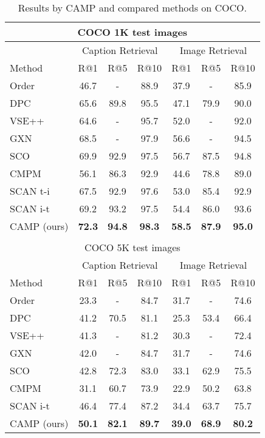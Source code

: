 \documentclass[10pt,twocolumn,letterpaper]{article}
\begin{document}
\begin{table}
\begin{center}
\small
\setlength{\tabcolsep}{1.3mm}
\begin{tabular}{|l|ccc|ccc|}
\hline
\multicolumn{7}{|c|}{COCO 1K test images}\\
\hline
& \multicolumn{3}{c|}{Caption Retrieval}
& \multicolumn{3}{c|}{Image Retrieval} \\
{Method}
& {R@1} & {R@5} & {R@10}
& {R@1} & {R@5} & {R@10}  \\
\hline\hline
Order~\cite{vendrov2015order} & 46.7 & - & 88.9 & 37.9 & - & 85.9 \\
DPC~\cite{zheng2017dual} & 65.6 & 89.8 & 95.5 & 47.1 & 79.9 & 90.0 \\
VSE++~\cite{faghri2017vse++} & 64.6 & - & 95.7 & 52.0 & - & 92.0  \\
GXN~\cite{gu2018look} & 68.5 & - & 97.9 & 56.6 & - & 94.5 \\
SCO~\cite{huang2017learning} & 69.9 & 92.9 & 97.5 & 56.7 & 87.5 & 94.8 \\
CMPM~\cite{ying2018CMPM} & 56.1 & 86.3 & 92.9 & 44.6 & 78.8 & 89.0 \\
SCAN t-i~\cite{lee2018stacked} & 67.5 & 92.9 & 97.6 & 53.0 & 85.4 & 92.9 \\
SCAN i-t~\cite{lee2018stacked} & 69.2 & 93.2 & 97.5 & 54.4 & 86.0 & 93.6 \\
\hline
CAMP (ours) & \textbf{72.3} & \textbf{94.8} & \textbf{98.3} & \textbf{58.5} & \textbf{87.9} & \textbf{95.0} \\
\hline
\multicolumn{7}{c}{} \\
\hline
\multicolumn{7}{|c|}{COCO 5K test images}\\
\hline
& \multicolumn{3}{c|}{Caption Retrieval}
& \multicolumn{3}{c|}{Image Retrieval} \\
{Method}
& {R@1} & {R@5} & {R@10}
& {R@1} & {R@5} & {R@10}  \\
\hline\hline
Order~\cite{vendrov2015order} & 23.3 & - & 84.7 & 31.7 & - & 74.6 \\
DPC~\cite{zheng2017dual} & 41.2 & 70.5 & 81.1 & 25.3 & 53.4 & 66.4 \\
VSE++~\cite{faghri2017vse++} & 41.3 & - & 81.2 & 30.3 & - & 72.4  \\
GXN~\cite{gu2018look} & 42.0 & - & 84.7 & 31.7 & - & 74.6 \\
SCO~\cite{huang2017learning} & 42.8 & 72.3 & 83.0 & 33.1 & 62.9 & 75.5 \\
CMPM~\cite{ying2018CMPM} & 31.1 & 60.7 & 73.9 & 22.9 & 50.2 & 63.8 \\
SCAN i-t~\cite{lee2018stacked}& 46.4 & 77.4 & 87.2 & 34.4 & 63.7 & 75.7 \\
\hline
CAMP (ours) & \textbf{50.1} & \textbf{82.1} & \textbf{89.7} & \textbf{39.0} & \textbf{68.9} & \textbf{80.2} \\
\hline
\end{tabular}
\end{center}
\vspace{-1.5mm}
\caption{Results by CAMP and compared methods on COCO.}
\label{tab:coco}
\end{table}
\end{document}
